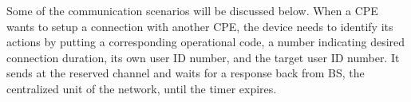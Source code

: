 Some of the communication scenarios will be discussed below. When a CPE wants to setup a connection with another CPE, the device needs to 
identify its actions by putting a corresponding operational code, a number indicating desired connection duration, its own user ID number, and 
the target user ID number. It sends at the reserved channel and waits for a response back from BS, the centralized unit of the network, until the timer expires. 
\begin{figure}[ht]
 \hfill 	
\end{figure}
